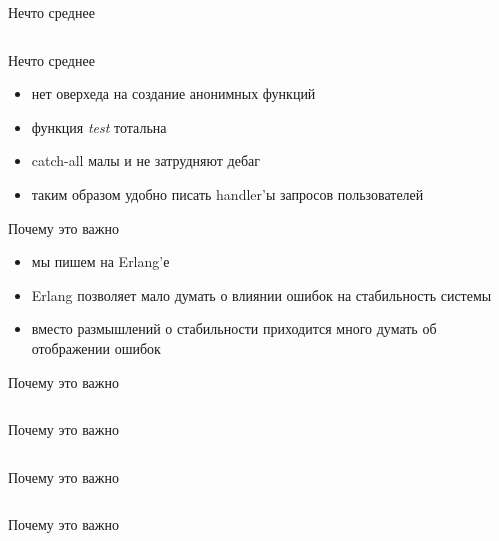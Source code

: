 \documentclass[10pt]{beamer}
\newcommand{\code}[4]{\inputminted[linenos, frame=none, firstline=#2, lastline=#3,
  framesep=10pt, bgcolor=lightgray]{#4}{#1}}
\begin{document}
\begin{frame}{Нечто среднее}
  \code{code.py}{95}{110}{python}
\end{frame}

\begin{frame}{Нечто среднее}
  \begin{itemize}
  \item нет оверхеда на создание анонимных функций
  \item функция \emph{test} тотальна
  \item catch-all малы и не затрудняют дебаг
  \item таким образом удобно писать handler'ы запросов пользователей
  \end{itemize}
\end{frame}

\begin{frame}{Почему это важно}
  \begin{itemize}
  \item мы пишем на Erlang'е
  \item Erlang позволяет мало думать о влиянии ошибок на стабильность системы
  \item вместо размышлений о стабильности приходится много думать об отображении ошибок
  \end{itemize}
\end{frame}

\begin{frame}{Почему это важно}
  \inputminted[linenos, frame=none, fontsize=\footnotesize,
  firstline=29, lastline=44, framesep=10pt, firstnumber=4,
  bgcolor=lightgray]{erlang}{code.erl}
\end{frame}

\begin{frame}{Почему это важно}
  \inputminted[linenos, frame=none, fontsize=\small,
  firstline=46, lastline=48, framesep=10pt,
  bgcolor=lightgray]{erlang}{code.erl}
\end{frame}

\begin{frame}{Почему это важно}
  \inputminted[linenos, frame=none, fontsize=\small,
  firstline=50, lastline=53, framesep=10pt, firstnumber=5,
  bgcolor=lightgray]{erlang}{code.erl}
\end{frame}

\begin{frame}{Почему это важно}
  \inputminted[linenos, frame=none, fontsize=\small,
  firstline=55, lastline=57, framesep=10pt, firstnumber=12,
  bgcolor=lightgray]{erlang}{code.erl}
\end{frame}
\end{document}
